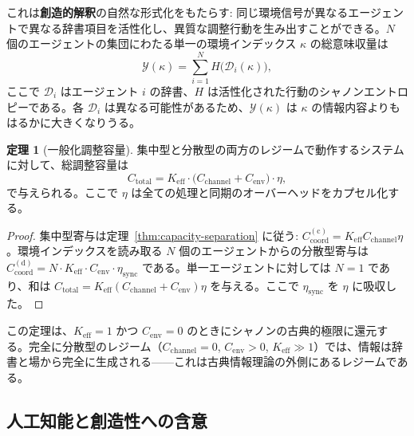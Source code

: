 \documentclass[12pt,a4paper]{article}
\theoremstyle{definition}
\newtheorem{theorem}{定理}[section]
\theoremstyle{remark}
\begin{document}
	これは\textbf{創造的解釈}の自然な形式化をもたらす: 同じ環境信号が異なるエージェントで異なる辞書項目を活性化し、異質な調整行動を生み出すことができる。$N$ 個のエージェントの集団にわたる単一の環境インデックス $\kappa$ の総意味収量は
	\begin{equation}
		\mathcal{Y}(\kappa) = \sum_{i=1}^{N} H\bigl(\mathcal{D}_i(\kappa)\bigr),
		\label{eq:semantic-yield}
	\end{equation}
	ここで $\mathcal{D}_i$ はエージェント $i$ の辞書、$H$ は活性化された行動のシャノンエントロピーである。各 $\mathcal{D}_i$ は異なる可能性があるため、$\mathcal{Y}(\kappa)$ は $\kappa$ の情報内容よりもはるかに大きくなりうる。
	
	\begin{theorem}[一般化調整容量]
		集中型と分散型の両方のレジームで動作するシステムに対して、総調整容量は
		\begin{equation}
			\boxed{C_{\mathrm{total}} = K_{\mathrm{eff}} \cdot \bigl( C_{\mathrm{channel}} + C_{\mathrm{env}} \bigr) \cdot \eta},
			\label{eq:generalized-capacity}
		\end{equation}
		で与えられる。ここで $\eta$ は全ての処理と同期のオーバーヘッドをカプセル化する。
	\end{theorem}
	
	\begin{proof}
		集中型寄与は定理~\ref{thm:capacity-separation} に従う: $C_{\mathrm{coord}}^{\mathrm{(c)}} = K_{\mathrm{eff}} C_{\mathrm{channel}} \eta$。環境インデックスを読み取る $N$ 個のエージェントからの分散型寄与は $C_{\mathrm{coord}}^{\mathrm{(d)}} = N \cdot K_{\mathrm{eff}} \cdot C_{\mathrm{env}} \cdot \eta_{\mathrm{sync}}$ である。単一エージェントに対しては $N=1$ であり、和は $C_{\mathrm{total}} = K_{\mathrm{eff}}(C_{\mathrm{channel}} + C_{\mathrm{env}})\eta$ を与える。ここで $\eta_{\mathrm{sync}}$ を $\eta$ に吸収した。
	\end{proof}
	
	この定理は、$K_{\mathrm{eff}} = 1$ かつ $C_{\mathrm{env}} = 0$ のときにシャノンの古典的極限に還元する。完全に分散型のレジーム（$C_{\mathrm{channel}} = 0$, $C_{\mathrm{env}} > 0$, $K_{\mathrm{eff}} \gg 1$）では、情報は辞書と場から完全に生成される——これは古典情報理論の外側にあるレジームである。
	
	\subsection{人工知能と創造性への含意}
	\label{subsec:AI-dypsdc}
	
\end{document}
